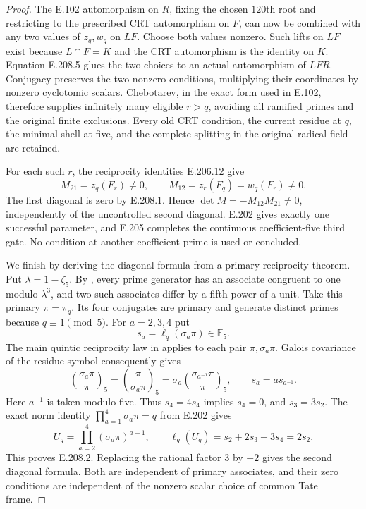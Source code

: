 \begin{proof}
The E.102 automorphism on $R$, fixing the chosen
$120$th root and restricting to the prescribed CRT
automorphism on $F$, can now be combined with any
two values of $z_q,w_q$ on $LF$. Choose both values
nonzero. Such lifts on $LF$ exist because $L\cap F=K$
and the CRT automorphism is the identity on $K$.
Equation E.208.5 glues the two choices to an actual
automorphism of $LFR$. Conjugacy preserves the two
nonzero conditions, multiplying their coordinates by
nonzero cyclotomic scalars. Chebotarev, in the exact
form used in E.102, therefore supplies infinitely many
eligible $r>q$, avoiding all ramified primes and the
original finite exclusions. Every old CRT condition,
the current residue at $q$, the minimal shell at five,
and the complete splitting in the original radical
field are retained.

For each such $r$, the reciprocity identities E.206.12
give
\[
      M_{21}=z_q(F_r)\ne0,\qquad
      M_{12}=z_r(F_q)=w_q(F_r)\ne0.                              \tag{E.208.6}
\]
The first diagonal is zero by E.208.1. Hence
$\det M=-M_{12}M_{21}\ne0$, independently of the
uncontrolled second diagonal. E.202 gives exactly
one successful parameter, and E.205 completes the
continuous coefficient-five third gate. No condition
at another coefficient prime is used or concluded.

We finish by deriving the diagonal formula from a
primary reciprocity theorem. Put $\lambda=1-\zeta_5$.
By \citet[Lemma1(a)--(b), pp.~322--323]{AuditGrant1996},
every prime generator has an associate congruent to
one modulo $\lambda^3$, and two such associates
differ by a fifth power of a unit. Take this primary
$\pi=\pi_q$. Its four conjugates are primary and
generate distinct primes because $q\equiv1\pmod5$.
For $a=2,3,4$ put
\[
                     s_a=\ell_q(\sigma_a\pi)\in\mathbb F_5.
\]
The main quintic reciprocity law in
\citet[Theorem (Kummer), p.~324]{AuditGrant1996} applies
to each pair $\pi,\sigma_a\pi$. Galois covariance
of the residue symbol consequently gives
\[
 \left(\frac{\sigma_a\pi}{\pi}\right)_5
   =\left(\frac{\pi}{\sigma_a\pi}\right)_5
   =\sigma_a\left(\frac{\sigma_{a^{-1}}\pi}{\pi}\right)_5,
 \qquad s_a=a s_{a^{-1}}.                                       \tag{E.208.7}
\]
Here $a^{-1}$ is taken modulo five. Thus $s_4=4s_4$
implies $s_4=0$, and $s_3=3s_2$.
The exact norm identity $\prod_{a=1}^4\sigma_a\pi=q$
from E.202 gives
\[
 U_q=\prod_{a=2}^4(\sigma_a\pi)^{a-1},\qquad
 \ell_q(U_q)=s_2+2s_3+3s_4=2s_2.                               \tag{E.208.8}
\]
This proves E.208.2. Replacing the rational factor
$3$ by $-2$ gives the second diagonal formula.
Both are independent of primary associates, and
their zero conditions are independent of the
nonzero scalar choice of common Tate frame.


\end{proof}
